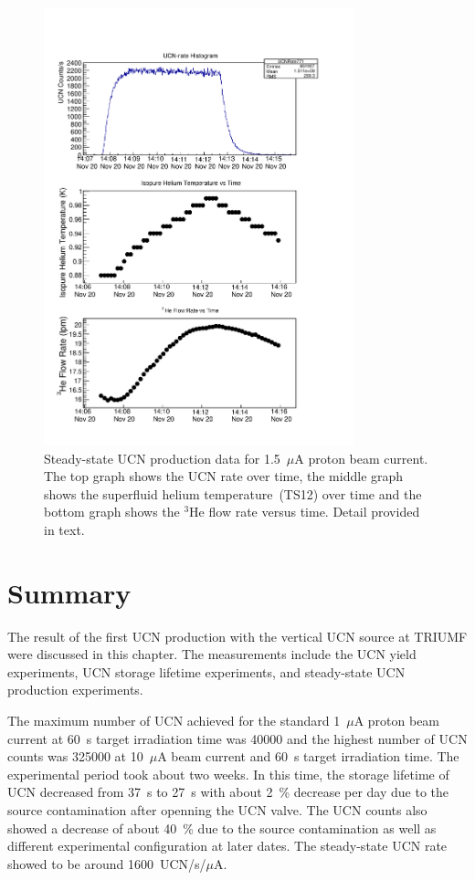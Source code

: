 \begin{figure}[h!]
  \centering \includegraphics[width=0.8\textwidth]{problemrun.pdf}
  \caption{Steady-state UCN production data for 1.5~$\mu$A proton beam
    current. The top graph shows the UCN rate over time, the middle
    graph shows the superfluid helium temperature~(TS12) over time and
    the bottom graph shows the $^3$He flow rate versus time. Detail
    provided in text.}
\label{fig:problemrun}
\end{figure}


\section{Summary}

The result of the first UCN production with the vertical UCN source at
TRIUMF were discussed in this chapter. The measurements include the UCN yield
experiments, UCN storage lifetime experiments, and steady-state UCN
production experiments.

The maximum number of UCN achieved for the standard 1~$\mu$A proton
beam current at 60~s target irradiation time was 40000 and the highest
number of UCN counts was 325000 at 10~$\mu$A beam current and 60~s
target irradiation time. The experimental period took about two
weeks. In this time, the storage lifetime of UCN decreased from 37~s
to 27~s with about 2~\% decrease per day due to the source
contamination after openning the UCN valve. The UCN counts also showed
a decrease of about 40~\% due to the source contamination as well as
different experimental configuration at later dates. The steady-state
UCN rate showed to be around 1600~UCN/s/$\mu$A.

